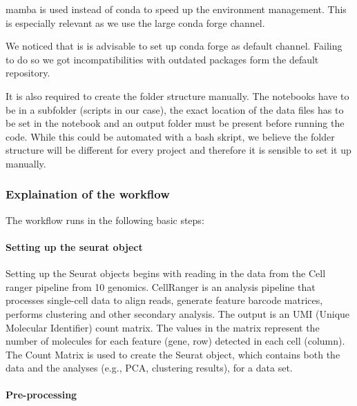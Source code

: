 mamba is used instead of conda to speed up the environment management.
This is especially relevant as we use the large conda forge channel.

We noticed that is is advisable to set up conda forge as default
channel. Failing to do so we got incompatibilities with outdated
packages form the default repository.

It is also required to create the folder structure manually. The
notebooks have to be in a subfolder (scripts in our case), the exact
location of the data files has to be set in the notebook and an output
folder must be present before running the code. While this could be
automated with a bash skript, we believe the folder structure will be
different for every project and therefore it is sensible to set it up
manually.

\hypertarget{explaination-of-the-workflow}{%
\subsubsection{Explaination of the
workflow}\label{explaination-of-the-workflow}}

The workflow runs in the following basic steps:

\hypertarget{setting-up-the-seurat-object}{%
\paragraph{Setting up the seurat
object}\label{setting-up-the-seurat-object}}

Setting up the Seurat objects begins with reading in the data from the
Cell ranger pipeline from 10 genomics. CellRanger is an analysis
pipeline that processes single-cell data to align reads, generate
feature barcode matrices, performs clustering and other secondary
analysis. The output is an UMI (Unique Molecular Identifier) count
matrix. The values in the matrix represent the number of molecules for
each feature (gene, row) detected in each cell (column). The Count
Matrix is used to create the Seurat object, which contains both the data
and the analyses (e.g., PCA, clustering results), for a data set.

\hypertarget{pre-processing}{%
\paragraph{Pre-processing}\label{pre-processing}}

